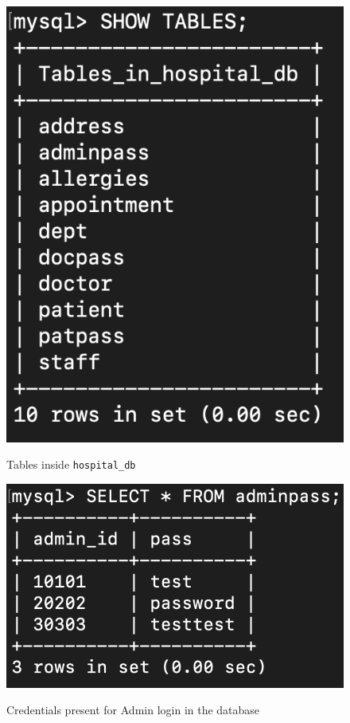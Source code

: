 \documentclass[12pt]{article}
\let\oldtexttt\texttt
\renewcommand{\texttt}[1]{
  \colorbox{bgcolor}{\oldtexttt{#1}}
  }
\begin{document}
\begin{figure}[!hbt]
    \centering
    \includegraphics[scale=0.55]{screenshots/1b.png}
    \label{fig:my_label1}
    \caption{Tables inside \texttt{hospital\_db}}
\end{figure}

\newpage

\begin{figure}[!hbt]
    \centering
    \includegraphics[scale=1.0]{screenshots/1c.png}
    \label{fig:data}
    \caption{Credentials present for Admin login in the database}
\end{figure}
\end{document}
